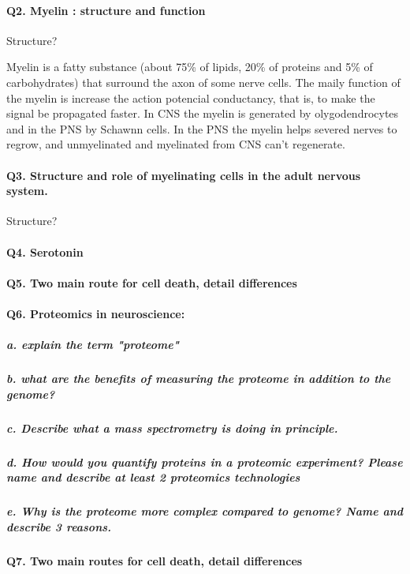 \documentclass[12pt,article,oneside,a4paper]{memoir}
\begin{document}
\paragraph{Q2. Myelin : structure and function}
Structure?

Myelin is a fatty substance (about 75\% of lipids, 20\% of proteins and 5\% of carbohydrates) that surround the axon of some nerve cells.
The maily function of the myelin is increase the action potencial conductancy, that is, to make the signal be propagated faster. In CNS the myelin is generated by olygodendrocytes and in the PNS by Schawnn cells.
In the PNS the myelin helps severed nerves to regrow, and unmyelinated and myelinated from CNS can't regenerate.

\paragraph{Q3. Structure and role of myelinating cells in the adult nervous system.}
Structure?

\paragraph{Q4. Serotonin}

\paragraph{Q5. Two main route for cell death, detail differences}

\paragraph{Q6. Proteomics in neuroscience:}
\subparagraph{a. explain the term "proteome"}
\subparagraph{b. what are the benefits of measuring the proteome in addition to the genome?}
\subparagraph{c. Describe what a mass spectrometry is doing in principle.}
\subparagraph{d. How would you quantify proteins in a proteomic experiment? Please name and describe at least 2 proteomics technologies}
\subparagraph{e. Why is the proteome more complex compared to genome? Name and describe 3 reasons.}

\paragraph{Q7. Two main routes for cell death, detail differences}

\end{document}
